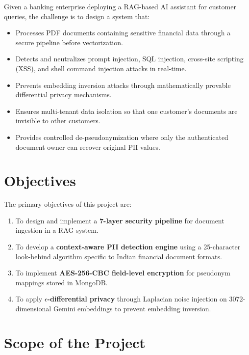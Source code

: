 Given a banking enterprise deploying a RAG-based AI assistant for customer queries, the challenge is to design a system that:

\begin{itemize}
    \item Processes PDF documents containing sensitive financial data through a secure pipeline before vectorization.
    \item Detects and neutralizes prompt injection, SQL injection, cross-site scripting (XSS), and shell command injection attacks in real-time.
    \item Prevents embedding inversion attacks through mathematically provable differential privacy mechanisms.
    \item Ensures multi-tenant data isolation so that one customer's documents are invisible to other customers.
    \item Provides controlled de-pseudonymization where only the authenticated document owner can recover original PII values.
\end{itemize}

\section{Objectives}

The primary objectives of this project are:

\begin{enumerate}
    \item To design and implement a \textbf{7-layer security pipeline} for document ingestion in a RAG system.
    
    \item To develop a \textbf{context-aware PII detection engine} using a 25-character look-behind algorithm specific to Indian financial document formats.
    
    \item To implement \textbf{AES-256-CBC field-level encryption} for pseudonym mappings stored in MongoDB.
    
    \item To apply \textbf{$\epsilon$-differential privacy} through Laplacian noise injection on 3072-dimensional Gemini embeddings to prevent embedding inversion.
\end{enumerate}

\section{Scope of the Project}

